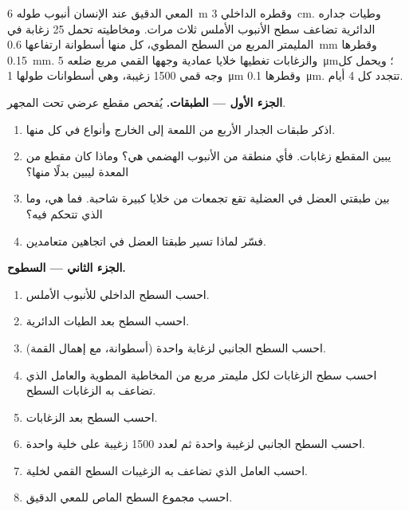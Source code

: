 \begin{problem}
\label{pb:b1:body-plans-tissues:1}
المعي الدقيق عند الإنسان أنبوب طوله \qty{6}{m} وقطره الداخلي
\qty{3}{cm}. وطيات جداره الدائرية تضاعف سطح الأنبوب الأملس ثلاث
مرات. ومخاطيته تحمل \qty{25}{} زغابة في المليمتر المربع من السطح
المطوي، كل منها أسطوانة ارتفاعها \qty{0.6}{mm} وقطرها
\qty{0.15}{mm}. والزغابات تغطيها خلايا عمادية وجهها القمي مربع ضلعه
\qty{5}{\micro m}؛ ويحمل كل وجه قمي \qty{1500}{} زغيبة، وهي أسطوانات
طولها \qty{1}{\micro m} وقطرها \qty{0.1}{\micro m}.  تتجدد كل
\qty{4}{} أيام.

\medskip
\noindent\textbf{الجزء الأول --- الطبقات.}
يُفحص مقطع عرضي تحت المجهر.
\begin{enumerate}
  \item اذكر طبقات الجدار الأربع من اللمعة إلى الخارج وأنواع 
        في كل منها.
  \item يبين المقطع زغابات. فأي منطقة من الأنبوب الهضمي هي؟ وماذا
        كان مقطع من المعدة ليبين بدلًا منها؟
  \item بين طبقتي العضل في العضلية تقع تجمعات من خلايا كبيرة شاحبة.
        فما هي، وما الذي تتحكم فيه؟
  \item فسّر لماذا تسير طبقتا العضل في اتجاهين متعامدين.
\end{enumerate}

\medskip
\noindent\textbf{الجزء الثاني --- السطوح.}
\begin{enumerate}[resume]
  \item احسب السطح الداخلي للأنبوب الأملس.
  \item احسب السطح بعد الطيات الدائرية.
  \item احسب السطح الجانبي لزغابة واحدة (أسطوانة، مع إهمال القمة).
  \item احسب سطح الزغابات لكل مليمتر مربع من المخاطية المطوية
        والعامل الذي تضاعف به الزغابات السطح.
  \item احسب السطح بعد الزغابات.
  \item احسب السطح الجانبي لزغيبة واحدة ثم لعدد \qty{1500}{} زغيبة على
        خلية واحدة.
  \item احسب العامل الذي تضاعف به الزغيبات السطح القمي لخلية.
  \item احسب مجموع السطح الماص للمعي الدقيق.
\end{enumerate}


\end{problem}
